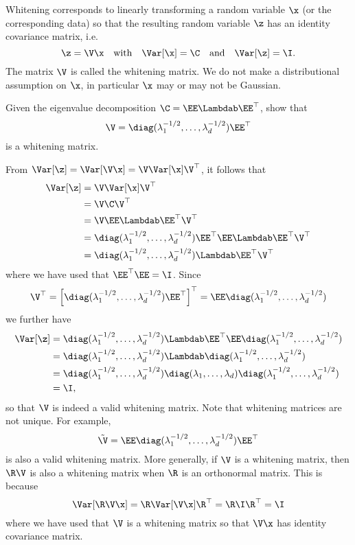 \begin{exenumerate}
  
\item Whitening corresponds to linearly transforming a random variable
  $\x$ (or the corresponding data) so that the resulting random variable $\z$ has an identity covariance matrix, i.e.\
  $$\z = \V \x \quad \text{with} \quad \Var[\x] = \C \quad
  \text{and}\quad \Var[\z] = \I. $$ The matrix $\V$ is called the
  whitening matrix. We do not make a distributional assumption on
  $\x$, in particular $\x$ may or may not be Gaussian.

  Given the eigenvalue decomposition $\C = \EE \Lambdab \EE^\top$,
  show that
  \begin{equation}
    \V = \diag (\lambda_1^{-1/2}, \ldots,  \lambda_d^{-1/2}) \EE^\top
  \end{equation}
  is a whitening matrix.
    
  \begin{solution}
    From $\Var[\z] = \Var[\V\x]= \V \Var[\x] \V^\top$, it follows that
    \begin{align}
      \Var[\z] & =  \V \Var[\x] \V^\top\\
      & =  \V \C \V^\top\\
      & =  \V \EE \Lambdab \EE^\top \V^\top\\
      & =   \diag (\lambda_1^{-1/2}, \ldots,
  \lambda_d^{-1/2}) \EE^\top \EE \Lambdab \EE^\top  \V^\top\\
& = \diag (\lambda_1^{-1/2}, \ldots,
  \lambda_d^{-1/2}) \Lambdab \EE^\top \V^\top
    \end{align}
    where we have used that $\EE^\top \EE = \I$. Since
    $$ \V^\top = \left[  \diag (\lambda_1^{-1/2}, \ldots, \lambda_d^{-1/2}) \EE^\top \right]^\top = \EE  \diag (\lambda_1^{-1/2}, \ldots, \lambda_d^{-1/2})$$
    we further have
    \begin{align}
      \Var[\z] & = \diag (\lambda_1^{-1/2}, \ldots,
      \lambda_d^{-1/2}) \Lambdab \EE^\top  \EE  \diag (\lambda_1^{-1/2}, \ldots, \lambda_d^{-1/2})\\
      & =  \diag (\lambda_1^{-1/2}, \ldots,
      \lambda_d^{-1/2}) \Lambdab \diag (\lambda_1^{-1/2}, \ldots, \lambda_d^{-1/2})\\
      & =  \diag (\lambda_1^{-1/2}, \ldots,
      \lambda_d^{-1/2}) \diag(\lambda_1, \ldots, \lambda_d) \diag (\lambda_1^{-1/2}, \ldots, \lambda_d^{-1/2})\\
      & = \I,
    \end{align}
    so that $\V$ is indeed a valid whitening matrix. Note that whitening matrices are not unique. For example,
   $$ \tilde{\V} = \EE \diag (\lambda_1^{-1/2}, \ldots,
    \lambda_d^{-1/2}) \EE^\top$$ is also a valid whitening
    matrix. More generally, if $\V$ is a whitening matrix, then $\R \V$ is
    also a whitening matrix when $\R$ is an orthonormal
    matrix. This is because
    $$ \Var[ \R \V \x ] = \R \Var[\V \x] \R^\top = \R \I \R^{\top} = \I $$
    where we have used that $\V$ is a whitening matrix so that $\V \x$ has identity covariance matrix.


\end{solution}
\end{exenumerate}

